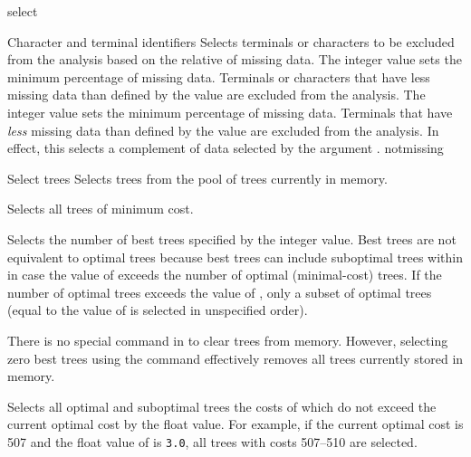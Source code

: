 \begin{command}{select}{}
\begin{arguments}
\begin{argumentgroup}{Character and terminal identifiers}
                {Selects terminals or characters to be excluded from the analysis
                based on the relative of missing data. The
                integer value sets the minimum percentage of missing
                data. Terminals or characters that have less missing data
                than defined by the value are excluded from the analysis.
                The integer value sets the minimum percentage of missing
                data. Terminals that have \emph{less} missing data than defined by
                the value are excluded from the analysis. In effect, this selects a
                complement of data selected by the argument .}
                {notmissing}

        \end{argumentgroup}

		\begin{argumentgroup}{Select trees}
			{Selects trees from the pool of trees currently in memory.}

				{Selects all trees of minimum cost.} 
                			{}
			
				{Selects the number of best trees specified by the integer value.
				Best trees are not equivalent to optimal trees because best trees
				can include suboptimal trees within in case the value of
				 exceeds the number of optimal (minimal-cost)
				trees. If the number of optimal trees exceeds the value of
				, only a subset of optimal trees (equal to the
				value of  is selected in unspecified order).} 
                			{}
	
	\begin{statement}
               There is no special command in \poy to clear trees from memory. However,
               selecting zero best trees using the command 
               effectively removes all trees currently stored in memory.
          \end{statement}
            
                {Selects all optimal and suboptimal trees the costs of which do not exceed
                the current optimal cost by the float value. For example, if the current
                optimal cost is 507 and the float value of  is
                \texttt{3.0}, all trees with costs 507--510 are selected.} 
                {}


\end{argumentgroup}
\end{arguments}
\end{command}
